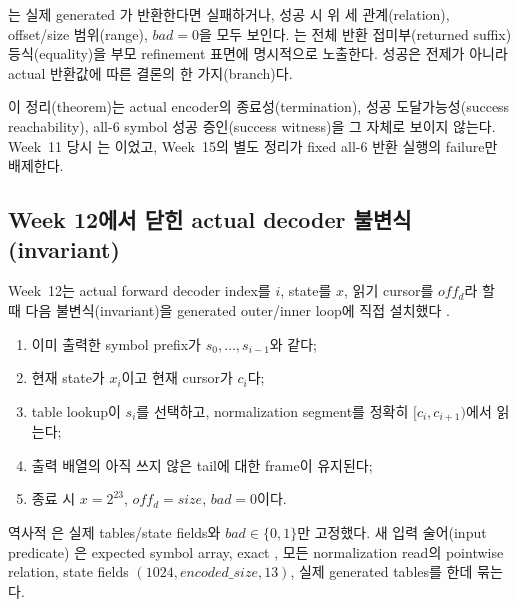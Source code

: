 \begin{verified}
는 실제 generated
가 반환한다면 실패하거나, 성공 시 위 세 관계(relation),
offset/size 범위(range), \(bad=0\)을 모두 보인다.
는 전체 반환
접미부(returned suffix) 등식(equality)을 부모 refinement 표면에 명시적으로
노출한다. 성공은 전제가 아니라 actual 반환값에 따른 결론의 한 가지(branch)다.
\end{verified}

\begin{caution}
이 정리(theorem)는 actual encoder의 종료성(termination), 성공
도달가능성(success reachability), all-6 symbol 성공 증인(success witness)을
그 자체로 보이지 않는다. Week~11 당시
는 \statuspartial 이었고, Week~15의
별도 정리가 fixed all-6 반환 실행의 failure만 배제한다.
\end{caution}

\subsection{Week 12에서 닫힌 actual decoder 불변식(invariant)}

Week~12는 actual forward decoder index를 \(i\), state를 \(x\), 읽기 cursor를
\(off_d\)라 할 때 다음 불변식(invariant)을 generated outer/inner loop에 직접
설치했다 \cite{week12-report,rans-decoder-invariant}.

\begin{enumerate}
  \item 이미 출력한 symbol prefix가 \(s_0,\ldots,s_{i-1}\)와 같다;
  \item 현재 state가 \(x_i\)이고 현재 cursor가 \(c_i\)다;
  \item table lookup이 \(s_i\)를 선택하고, normalization segment를 정확히
        \([c_i,c_{i+1})\)에서 읽는다;
  \item 출력 배열의 아직 쓰지 않은 tail에 대한 frame이 유지된다;
  \item 종료 시 \(x=2^{23}\), \(off_d=size\), \(bad=0\)이다.
\end{enumerate}

역사적 은 실제 tables/state fields와
\(bad\in\{0,1\}\)만 고정했다. 새 입력 술어(input predicate)
은 expected symbol array, exact
, 모든 normalization read의 pointwise relation, state
fields \((1024,encoded\_size,13)\), 실제 generated tables를 한데 묶는다.

